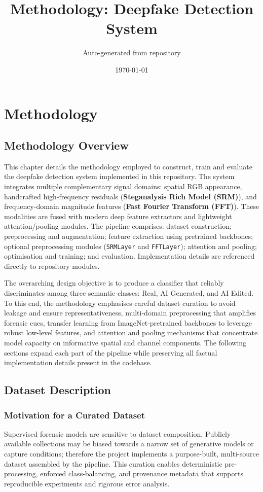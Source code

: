 \documentclass[11pt]{report}
\begin{document}
\onehalfspacing

\title{Methodology: Deepfake Detection System}
\author{Auto-generated from repository}
\date{\today}
\maketitle
\tableofcontents
\clearpage

\chapter{Methodology}

\section{Methodology Overview}
This chapter details the methodology employed to construct, train and evaluate
the deepfake detection system implemented in this repository. The system
integrates multiple complementary signal domains: spatial RGB appearance,
handcrafted high-frequency residuals (\textbf{Steganalysis Rich Model (SRM)}), and frequency-domain magnitude
features (\textbf{Fast Fourier Transform (FFT)}). These modalities are fused
with modern deep feature extractors and lightweight attention/pooling modules.
The pipeline comprises: dataset construction; preprocessing and augmentation;
feature extraction using pretrained backbones; optional preprocessing modules
(\texttt{SRMLayer} and \texttt{FFTLayer}); attention and pooling; optimisation and
training; and evaluation. Implementation details are referenced directly to
repository modules.

The overarching design objective is to produce a classifier that reliably
discriminates among three semantic classes: Real, AI Generated, and AI Edited.
To this end, the methodology emphasises careful dataset curation to avoid
leakage and ensure representativeness, multi-domain preprocessing that
amplifies forensic cues, transfer learning from ImageNet-pretrained backbones
to leverage robust low-level features, and attention and pooling mechanisms
that concentrate model capacity on informative spatial and channel components.
The following sections expand each part of the pipeline while preserving all
factual implementation details present in the codebase.

\section{Dataset Description}
\subsection{Motivation for a Curated Dataset}
Supervised forensic models are sensitive to dataset composition. Publicly
available collections may be biased towards a narrow set of generative models
or capture conditions; therefore the project implements a purpose-built,
multi-source dataset assembled by the pipeline.
This curation enables deterministic pre-processing, enforced class-balancing,
and provenance metadata that supports reproducible experiments and rigorous
error analysis.
\end{document}
